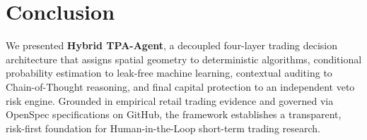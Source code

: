 \documentclass[conference]{IEEEtran}
\begin{document}
\section{Conclusion}
We presented \textbf{Hybrid TPA-Agent}, a decoupled four-layer trading decision architecture that assigns spatial geometry to deterministic algorithms, conditional probability estimation to leak-free machine learning, contextual auditing to Chain-of-Thought reasoning, and final capital protection to an independent veto risk engine. Grounded in empirical retail trading evidence and governed via OpenSpec specifications on GitHub, the framework establishes a transparent, risk-first foundation for Human-in-the-Loop short-term trading research.



\end{document}
